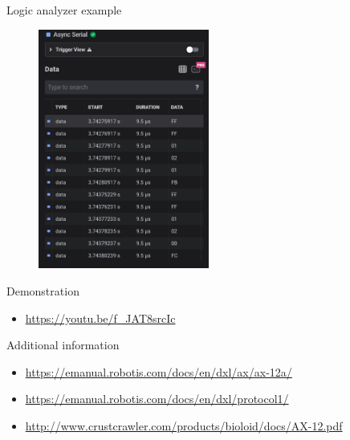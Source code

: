 \documentclass{beamer}
\begin{document}
\begin{frame}{Logic analyzer example}

    \begin{figure}
        \centering
        \includegraphics[width = 0.5\textwidth]{img/logic_2.PNG}

    \end{figure}

\end{frame}





\begin{frame}{Demonstration}


        \begin{itemize}
            \item \url{https://youtu.be/f_JAT8srcIc}
        \end{itemize}

    
\end{frame}




\begin{frame}{Additional information}


    \begin{itemize}
        \item \url{https://emanual.robotis.com/docs/en/dxl/ax/ax-12a/}
        \item \url{https://emanual.robotis.com/docs/en/dxl/protocol1/}
        \item \url{http://www.crustcrawler.com/products/bioloid/docs/AX-12.pdf}
    \end{itemize}


\end{frame}
\end{document}
